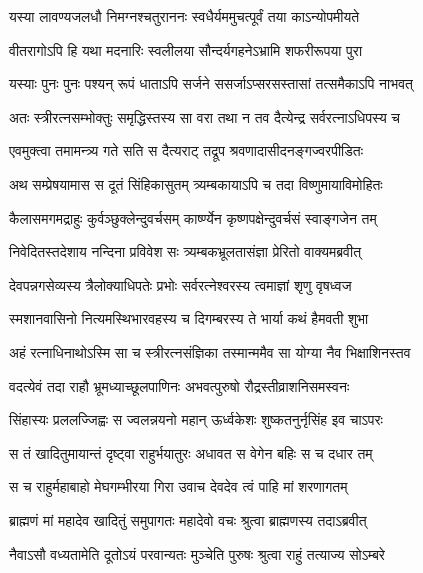 \twolineshloka
{यस्या लावण्यजलधौ निमग्नश्चतुराननः}
{स्वधैर्यममुचत्पूर्वं तया काऽन्योपमीयते} %

\twolineshloka
{वीतरागोऽपि हि यथा मदनारिः स्वलीलया}
{सौन्दर्यगहनेऽभ्रामि शफरीरूपया पुरा} %

\twolineshloka
{यस्याः पुनः पुनः पश्यन् रूपं धाताऽपि सर्जने}
{ससर्जाऽप्सरसस्तासां तत्समैकाऽपि नाभवत्} %

\twolineshloka
{अतः स्त्रीरत्नसम्भोक्तुः समृद्धिस्तस्य सा वरा}
{तथा न तव दैत्येन्द्र सर्वरत्नाऽधिपस्य च} %

\twolineshloka
{एवमुक्त्वा तमामन्त्र्य गते सति स दैत्यराट्}
{तद्रूप श्रवणादासीदनङ्गज्वरपीडितः} %

\twolineshloka
{अथ सम्प्रेषयामास स दूतं सिंहिकासुतम्}
{त्र्यम्बकायाऽपि च तदा विष्णुमायाविमोहितः} %

\twolineshloka
{कैलासमगमद्राहुः कुर्वञ्छुक्लेन्दुवर्चसम्}
{कार्ष्ण्येन कृष्णपक्षेन्दुवर्चसं स्वाङ्गजेन तम्} %

\twolineshloka
{निवेदितस्तदेशाय नन्दिना प्रविवेश सः}
{त्र्यम्बकभ्रूलतासंज्ञा प्रेरितो वाक्यमब्रवीत्} %


\twolineshloka
{देवपन्नगसेव्यस्य त्रैलोक्याधिपतेः प्रभोः}
{सर्वरत्नेश्वरस्य त्वमाज्ञां शृणु वृषध्वज} %

\twolineshloka
{स्मशानवासिनो नित्यमस्थिभारवहस्य च}
{दिगम्बरस्य ते भार्या कथं हैमवती शुभा} %

\twolineshloka
{अहं रत्नाधिनाथोऽस्मि सा च स्त्रीरत्नसंज्ञिका}
{तस्मान्ममैव सा योग्या नैव भिक्षाशिनस्तव} %


\twolineshloka
{वदत्येवं तदा राहौ भ्रूमध्याच्छूलपाणिनः}
{अभवत्पुरुषो रौद्रस्तीव्राशनिसमस्वनः} %

\twolineshloka
{सिंहास्यः प्रललज्जिह्वः स ज्वलन्नयनो महान्}
{ऊर्ध्वकेशः शुष्कतनुर्नृसिंह इव चाऽपरः} %

\twolineshloka
{स तं खादितुमायान्तं दृष्ट्वा राहुर्भयातुरः}
{अधावत स वेगेन बहिः स च दधार तम्} %

\twolineshloka
{स च राहुर्महाबाहो मेघगम्भीरया गिरा}
{उवाच देवदेव त्वं पाहि मां शरणागतम्} %

\twolineshloka
{ब्राह्मणं मां महादेव खादितुं समुपागतः}
{महादेवो वचः श्रुत्वा ब्राह्मणस्य तदाऽब्रवीत्} %

\twolineshloka
{नैवाऽसौ वध्यतामेति दूतोऽयं परवान्यतः}
{मुञ्चेति पुरुषः श्रुत्वा राहुं तत्याज्य सोऽम्बरे} %




